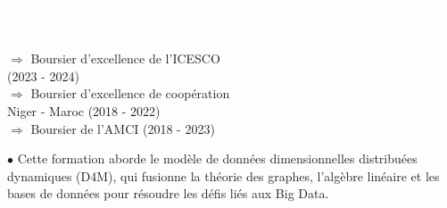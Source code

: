 \documentclass[theme]{cv_einstein}
\begin{document}
\begin{paracol}{2}
        
\begin{leftcolumn} \noindent \small
    \textcolor{white}{\: \faLineChart\ Bourse }
    \textcolor{white}{\:\faSoccerBallO \ Football} \textcolor{white}{\: \faGamepad\ Jeux vidéo}  \\
    \textcolor{white}{\: \faBook\ Lecture}
    \textcolor{white}{\: \faLeaf\ Écologie}
    \textcolor{white}{\: \faPlane\ Voyages }
\end{leftcolumn}
        \begin{leftcolumn}\noindent \footnotesize
        {\color{white}
\normalsize 
 $\Longrightarrow$ Boursier d'excellence de l'ICESCO \\  (2023 - 2024) \\ [0.5em]
 $\Longrightarrow$  Boursier d'excellence de coopération \\ \;\;\;\; Niger - Maroc  (2018 - 2022) \\ [0.5em]
 $\Longrightarrow$ Boursier de l'AMCI (2018 - 2023)

}
        \end{leftcolumn}
        \begin{rightcolumn}\noindent \normalsize
            \hspace{-2.4pt}
            {\normalsize $\bullet$ Cette formation aborde le modèle de données dimensionnelles distribuées dynamiques (D4M), qui fusionne la théorie des graphes, l'algèbre linéaire et les bases de données pour résoudre les défis liés aux Big Data.}
             
          
            \end{rightcolumn}
            \begin{rightcolumn}\noindent \small
        \end{rightcolumn}
        \vspace{0em}
    \end{paracol}
\end{document}
